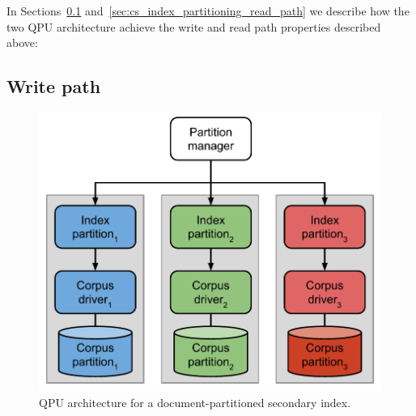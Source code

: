 In Sections~\ref{sec:cs_index_partitioning_write_path} and~\ref{sec:cs_index_partitioning_read_path} we describe
how the two QPU architecture achieve the write and read path properties described above:

\subsection{Write path}
\label{sec:cs_index_partitioning_write_path}

\begin{figure}
  \begin{minipage}{.5\textwidth}
    \centering
    \includegraphics[scale=0.5]{./figures/case_studies/index_partitioned_by_document.pdf}
    \caption{QPU architecture for a document-partitioned secondary index.}
    \label{fig:index_partitioned_by_document}
  \end{minipage}%
  \begin{minipage}{.5\textwidth}
    \centering

\end{minipage}
\end{figure}
